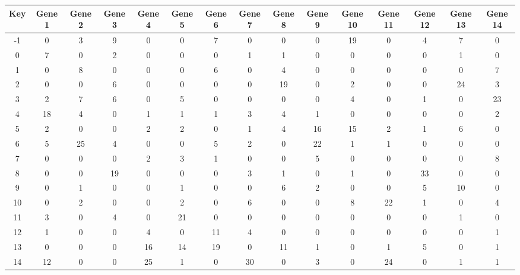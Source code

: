 \begin{tabular}{|c|c|c|c|c|c|c|c|c|c|c|c|c|c|c|}
\hline
Key & Gene 1 & Gene 2 & Gene 3 & Gene 4 & Gene 5 & Gene 6 & Gene 7 & Gene 8 & Gene 9 & Gene 10 & Gene 11 & Gene 12 & Gene 13 & Gene 14 \\
\hline
-1 & 0 & 3 & 9 & 0 & 0 & 7 & 0 & 0 & 0 & 19 & 0 & 4 & 7 & 0 \\
0 & 7 & 0 & 2 & 0 & 0 & 0 & 1 & 1 & 0 & 0 & 0 & 0 & 1 & 0 \\
1 & 0 & 8 & 0 & 0 & 0 & 6 & 0 & 4 & 0 & 0 & 0 & 0 & 0 & 7 \\
2 & 0 & 0 & 6 & 0 & 0 & 0 & 0 & 19 & 0 & 2 & 0 & 0 & 24 & 3 \\
3 & 2 & 7 & 6 & 0 & 5 & 0 & 0 & 0 & 0 & 4 & 0 & 1 & 0 & 23 \\
4 & 18 & 4 & 0 & 1 & 1 & 1 & 3 & 4 & 1 & 0 & 0 & 0 & 0 & 2 \\
5 & 2 & 0 & 0 & 2 & 2 & 0 & 1 & 4 & 16 & 15 & 2 & 1 & 6 & 0 \\
6 & 5 & 25 & 4 & 0 & 0 & 5 & 2 & 0 & 22 & 1 & 1 & 0 & 0 & 0 \\
7 & 0 & 0 & 0 & 2 & 3 & 1 & 0 & 0 & 5 & 0 & 0 & 0 & 0 & 8 \\
8 & 0 & 0 & 19 & 0 & 0 & 0 & 3 & 1 & 0 & 1 & 0 & 33 & 0 & 0 \\
9 & 0 & 1 & 0 & 0 & 1 & 0 & 0 & 6 & 2 & 0 & 0 & 5 & 10 & 0 \\
10 & 0 & 2 & 0 & 0 & 2 & 0 & 6 & 0 & 0 & 8 & 22 & 1 & 0 & 4 \\
11 & 3 & 0 & 4 & 0 & 21 & 0 & 0 & 0 & 0 & 0 & 0 & 0 & 1 & 0 \\
12 & 1 & 0 & 0 & 4 & 0 & 11 & 4 & 0 & 0 & 0 & 0 & 0 & 0 & 1 \\
13 & 0 & 0 & 0 & 16 & 14 & 19 & 0 & 11 & 1 & 0 & 1 & 5 & 0 & 1 \\
14 & 12 & 0 & 0 & 25 & 1 & 0 & 30 & 0 & 3 & 0 & 24 & 0 & 1 & 1 \\
\hline
\end{tabular}